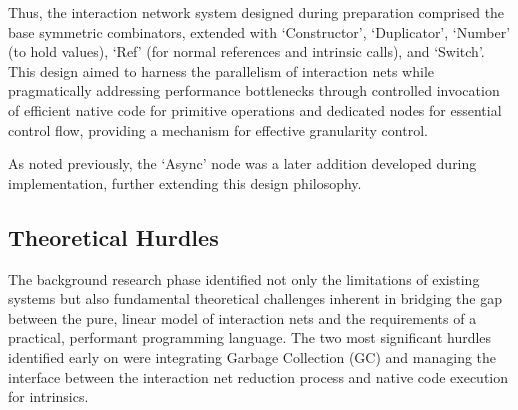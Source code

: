 Thus, the interaction network system designed during preparation comprised the base symmetric combinators, extended with `Constructor', `Duplicator', `Number' (to hold values), `Ref' (for normal references and intrinsic calls), and `Switch'. This design aimed to harness the parallelism of interaction nets while pragmatically addressing performance bottlenecks through controlled invocation of efficient native code for primitive operations and dedicated nodes for essential control flow, providing a mechanism for effective granularity control.

As noted previously, the `Async' node was a later addition developed during implementation, further extending this design philosophy.



\subsection{Theoretical Hurdles}

The background research phase identified not only the limitations of existing systems but also fundamental theoretical challenges inherent in bridging the gap between the pure, linear model of interaction nets and the requirements of a practical, performant programming language. The two most significant hurdles identified early on were integrating Garbage Collection (GC) and managing the interface between the interaction net reduction process and native code execution for intrinsics.

